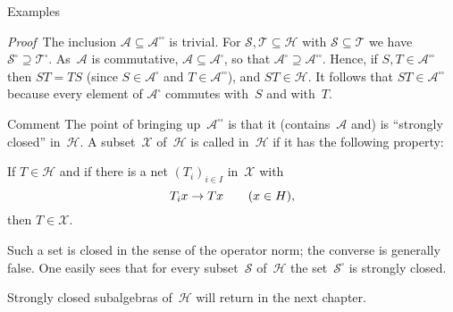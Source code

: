 \documentclass[main.tex]{subfiles}
\begin{document}
\begin{psec}{5.16}{Examples}
\begin{enumerate}
\emph{Proof}\  The inclusion 
$\mathscr{A}\subseteq{\mathscr{A}}^{\square\square}$ is trivial.
For $\mathscr{S},\mathscr{T}\subseteq\mathscr H$
with $\mathscr{S}\subseteq\mathscr{T}$
we have ${\mathscr S}^\square\supseteq{\mathscr T}^\square$.
As~$\mathscr{A}$ is commutative,
$\mathscr A\subseteq {\mathscr A}^\square$,
so that ${\mathscr A}^\square \supseteq {\mathscr A}^{\square\square}$.
Hence, if $S,T\in{\mathscr A}^{\square\square}$
then $ST=TS$
(since $S\in{\mathscr A}^\square$ and $T\in{\mathscr A}^{\square\square}$),
and $ST\in\mathscr H$.
It follows that $ST\in{\mathscr A}^{\square\square}$
because every element of ${\mathscr A}^\square$
commutes with~$S$ and with~$T$.
\end{enumerate}
\end{psec}
%
%
\begin{psec}{5.17}{Comment}
The point of bringing up~${\mathscr A}^{\square\square}$
is that it (contains~$\mathscr A$ and) is
``strongly closed'' in~$\mathscr H$.
A subset~$\mathscr X$ of~$\mathscr H$ is called
 in~$\mathscr H$
if it has the following property:
\vspace{.5em}
\begin{center}
\begin{minipage}{.35\textwidth}
If $T\in\mathscr H$ and if there is a net
$(T_i)_{i\in I}$ in~$\mathscr X$ with
\begin{equation*}
T_i x \rightarrow T x\qquad (x\in H)\text{,}
\end{equation*}
then $T\in\mathscr X$.
\end{minipage}
\end{center}
\vspace{.5em}
Such a set is closed in the sense of the operator norm;
the converse is generally false.
One easily sees that for every subset~$\mathscr S$
of~$\mathscr H$ the set~${\mathscr S}^\square$ is strongly closed.

Strongly closed subalgebras of~$\mathscr H$
will return in the next chapter.
\end{psec}
\end{document}
